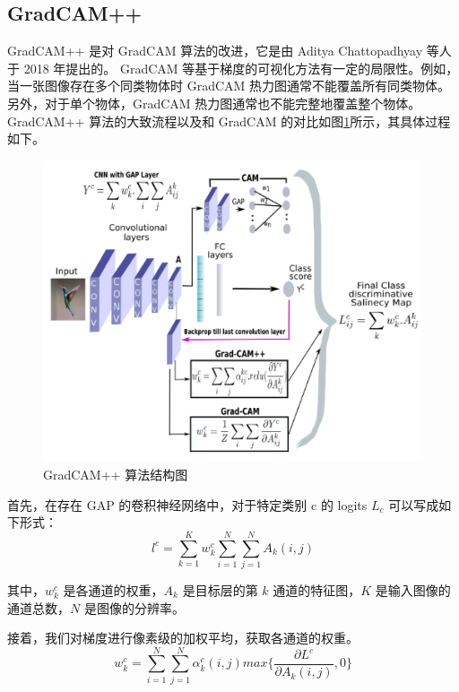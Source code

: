 \documentclass[supercite]{Experimental_Report}
\theoremstyle{definition}
\begin{document}
\subsection{GradCAM++}
GradCAM++\cite{GradCAM++} 是对 GradCAM 算法的改进，它是由 Aditya Chattopadhyay 等人于 2018 年提出的。
GradCAM 等基于梯度的可视化方法有一定的局限性。例如，当一张图像存在多个同类物体时 GradCAM 热力图通常不能覆盖所有同类物体。
另外，对于单个物体，GradCAM 热力图通常也不能完整地覆盖整个物体。
GradCAM++ 算法的大致流程以及和 GradCAM 的对比如图\ref{GradCAM++}所示，其具体过程如下。
\begin{figure}[H]
	\begin{center}
		\includegraphics[scale=1.0]{../images/GradCAM++算法结构图.png}
		\caption{GradCAM++ 算法结构图}
		\label{GradCAM++}
	\end{center}
\end{figure}

首先，在存在 GAP 的卷积神经网络中，对于特定类别 c 的 logits $L_c$ 可以写成如下形式：
\begin{equation}
l^c=\sum_{k=1}^{K}w_k^c\sum_{i=1}^{N}\sum_{j=1}^{N}A_k(i,j)
\end{equation}

其中，$w_k^c$ 是各通道的权重，$A_k$ 是目标层的第 $k$ 通道的特征图，$K$ 是输入图像的通道总数，$N$ 是图像的分辨率。

接着，我们对梯度进行像素级的加权平均，获取各通道的权重。
\begin{equation}
w_k^c=\sum_{i=1}^{N}\sum_{j=1}^{N}\alpha_k^c(i,j)max\{\frac{\partial L^c}{\partial A_k(i, j)},0\}
\end{equation}
\end{document}

